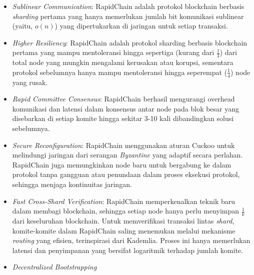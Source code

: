 \begin{itemize}
  \item \textit{Sublinear Communication}: RapidChain adalah protokol blockchain berbasis \textit{sharding} pertama yang hanya memerlukan jumlah bit komunikasi sublinear (yaitu, $o(n)$) yang dipertukarkan di jaringan untuk setiap transaksi.
  \item \textit{Higher Resiliency}: RapidChain adalah protokol sharding berbasis blockchain pertama yang mampu mentoleransi hingga sepertiga (kurang dari $\frac{1}{3}$) dari total node yang mungkin mengalami kerusakan atau korupsi, sementara protokol sebelumnya hanya mampu mentoleransi hingga seperempat ($\frac{1}{4}$) node yang rusak.
  \item \textit{Rapid Committee Consensus}: RapidChain berhasil mengurangi overhead komunikasi dan latensi dalam konsensus antar node pada blok besar yang disebarkan di setiap komite hingga sekitar 3-10 kali dibandingkan solusi sebelumnya.
  \item \textit{Secure Reconfiguration}: RapidChain menggunakan aturan Cuckoo untuk melindungi jaringan dari serangan \textit{Byzantine} yang adaptif secara perlahan. RapidChain juga memungkinkan node baru untuk bergabung ke dalam protokol tanpa gangguan atau penundaan dalam proses eksekusi protokol, sehingga menjaga kontinuitas jaringan.
  \item \textit{Fast Cross-Shard Verification}: RapidChain memperkenalkan teknik baru dalam membagi blockchain, sehingga setiap node hanya perlu menyimpan $\frac{1}{k}$ dari keseluruhan blockchain. Untuk memverifikasi transaksi lintas \textit{shard}, komite-komite dalam RapidChain saling menemukan melalui mekanisme \textit{routing} yang efisien, terinspirasi dari Kademlia. Proses ini hanya memerlukan latensi dan penyimpanan yang bersifat logaritmik terhadap jumlah komite.
  \item \textit{Decentralized Bootstrapping}
\end{itemize}